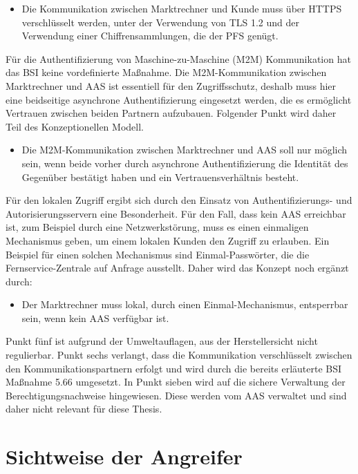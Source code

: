 \documentclass[11pt,a4paper]{report}
\begin{document}
\begin{itemize}[leftmargin=*]
\item Die Kommunikation zwischen Marktrechner und Kunde muss über HTTPS verschlüsselt werden, unter der Verwendung von TLS 1.2 und der Verwendung einer Chiffrensammlungen, die der PFS genügt.
\end{itemize}

Für die Authentifizierung von Maschine-zu-Maschine (M2M) Kommunikation hat das BSI keine vordefinierte Maßnahme. Die M2M-Kommunikation zwischen Marktrechner und AAS ist essentiell für den Zugriffsschutz, deshalb muss hier eine beidseitige asynchrone Authentifizierung eingesetzt werden, die es ermöglicht Vertrauen zwischen beiden Partnern aufzubauen. Folgender Punkt wird daher Teil des Konzeptionellen Modell.

\begin{itemize}[leftmargin=*]
\item Die M2M-Kommunikation zwischen Marktrechner und AAS soll nur möglich sein, wenn beide vorher durch asynchrone Authentifizierung die Identität des Gegenüber bestätigt haben und ein Vertrauensverhältnis besteht.
\end{itemize}

Für den lokalen Zugriff ergibt sich durch den Einsatz von Authentifizierungs- und Autorisierungsservern eine Besonderheit. Für den Fall, dass kein AAS erreichbar ist, zum Beispiel durch eine Netzwerkstörung, muss es einen einmaligen Mechanismus geben, um einem lokalen Kunden den Zugriff zu erlauben. Ein Beispiel für einen solchen Mechanismus sind Einmal-Passwörter, die die Fernservice-Zentrale auf Anfrage ausstellt. Daher wird das Konzept noch ergänzt durch:

\begin{itemize}[leftmargin=*]
\item Der Marktrechner muss lokal, durch einen Einmal-Mechanismus, entsperrbar sein, wenn kein AAS verfügbar ist.
\end{itemize}

Punkt fünf ist aufgrund der Umweltauflagen, aus der Herstellersicht nicht regulierbar. Punkt sechs verlangt, dass die Kommunikation verschlüsselt zwischen den Kommunikationspartnern erfolgt und wird durch die bereits erläuterte BSI Maßnahme 5.66 umgesetzt. In Punkt sieben wird auf die sichere Verwaltung der Berechtigungsnachweise hingewiesen. Diese werden vom AAS verwaltet und sind daher nicht relevant für diese Thesis.

\section{Sichtweise der Angreifer} \label{sec:attackers}
\end{document}
